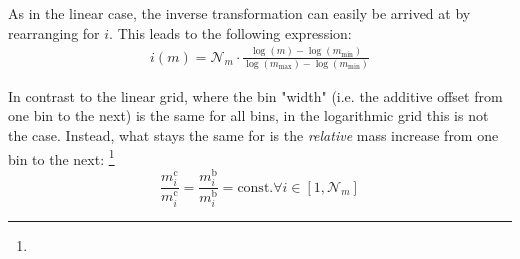         As in the linear case, the inverse transformation can easily be arrived at by rearranging for 
        $i$. This leads to the following expression:
        \begin{align}
            i(m)
                =\mathcal N_m\cdot
                    \frac{\log(m)-\log(m_\text{min})}{\log(m_\text{max})-\log(m_\text{min})}
        \end{align}
        
        In contrast to the linear grid, where the bin "width" (i.e. the additive offset from one 
        bin to the next) is the same for all bins, in the logarithmic grid this is not the case.
        Instead, what stays the same for is the \textit{relative} mass increase from one bin to the
        next:
        \footnote{}
        \begin{equation}
            \frac{m_i^\text{c}}{m_i^\text{c}}
                =\frac{m_i^\text{b}}{m_i^\text{b}}
                =\text{const.}
                \forall i\in[1,\mathcal N_m]
        \end{equation}

